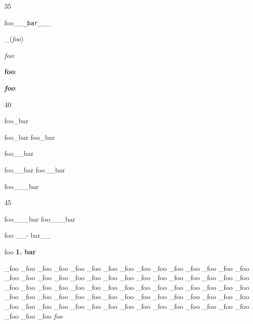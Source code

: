 35

foo\_\_\texttt{_bar_}\_\_

\_(\emph{foo})

\emph{foo}:

\textbf{foo}:

\textbf{\emph{foo}}:

40

foo\_bar

foo\_bar foo\_bar

foo\_\_bar

foo\_\_bar foo\_\_bar

foo\_\_\_bar

45

foo\_\_\_bar foo\_\_\_bar

foo \_\_- bar\_\_

foo \textbf{1. bar}

\_foo
\_foo
\_foo
\_foo
\_foo
\_foo
\_foo
\_foo
\_foo
\_foo
\_foo
\_foo
\_foo
\_foo
\_foo
\_foo
\_foo
\_foo
\_foo
\_foo
\_foo
\_foo
\_foo
\_foo
\_foo
\_foo
\_foo
\_foo
\_foo
\_foo
\_foo
\_foo
\_foo
\_foo
\_foo
\_foo
\_foo
\_foo
\_foo
\_foo
\_foo
\_foo
\_foo
\_foo
\_foo
\_foo
\_foo
\_foo
\_foo
\_foo
\_foo
\_foo
\_foo
\_foo
\_foo
\_foo
\_foo
\_foo
\_foo
\_foo
\_foo
\_foo
\_foo
\_foo
\_foo
\_foo
\_foo
\_foo
\_foo
\_foo
\_foo
\_foo
\_foo
\_foo
\_foo
\_foo
\_foo
\_foo
\emph{foo}



